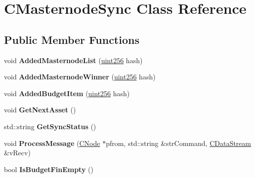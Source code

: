 \hypertarget{class_c_masternode_sync}{}\section{C\+Masternode\+Sync Class Reference}
\label{class_c_masternode_sync}
\subsection*{Public Member Functions}
\begin{DoxyCompactItemize}
\item 
\mbox{\label{class_c_masternode_sync_aecd6f9f5537d7ef789bd62c394ea59c8}} 
void {\bfseries Added\+Masternode\+List} (\mbox{\hyperlink{classuint256}{uint256}} hash)
\item 
\mbox{\label{class_c_masternode_sync_a312ff09a0ea92f79abbfaff00dcc47bd}} 
void {\bfseries Added\+Masternode\+Winner} (\mbox{\hyperlink{classuint256}{uint256}} hash)
\item 
\mbox{\label{class_c_masternode_sync_a838ed1ca5c2e127e43538992a3881dd9}} 
void {\bfseries Added\+Budget\+Item} (\mbox{\hyperlink{classuint256}{uint256}} hash)
\item 
\mbox{\label{class_c_masternode_sync_aa3a14e330fec1e6662e9c1387df0c1af}} 
void {\bfseries Get\+Next\+Asset} ()
\item 
\mbox{\label{class_c_masternode_sync_ac95f70e4b942ac8533a064f3fdc45ba4}} 
std\+::string {\bfseries Get\+Sync\+Status} ()
\item 
\mbox{\label{class_c_masternode_sync_a06209bd466ed87b191d8d9883fce984f}} 
void {\bfseries Process\+Message} (\mbox{\hyperlink{class_c_node}{C\+Node}} $\ast$pfrom, std\+::string \&str\+Command, \mbox{\hyperlink{class_c_data_stream}{C\+Data\+Stream}} \&v\+Recv)
\item 
\mbox{\label{class_c_masternode_sync_ad64d2bd3339331c677e3506c2f580ac1}} 
bool {\bfseries Is\+Budget\+Fin\+Empty} ()
\item 
\mbox{\label{class_c_masternode_sync_aeb462aeef3a556d6789f0510d9c65131}} 

\end{DoxyCompactItemize}
